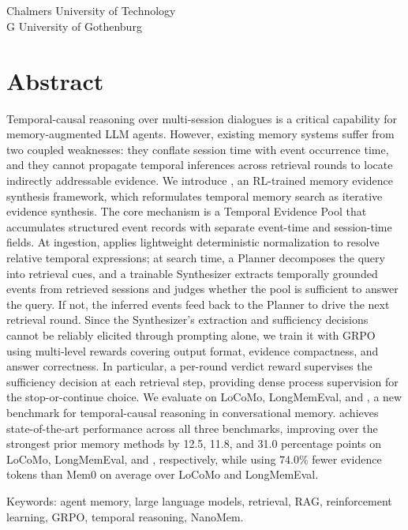 \ThesisTitle\\
\ThesisSubtitle\\
\ThesisAuthor\\
\ThesisDepartment\\
Chalmers University of Technology\\
\if\InstitutionLocation G
University of Gothenburg\\
\fi
\setlength{\parskip}{0.5cm}

\thispagestyle{plain}			%
\setlength{\parskip}{0pt plus 1.0pt}
\section*{Abstract}
Temporal-causal reasoning over multi-session dialogues is a critical capability
for memory-augmented LLM agents. However, existing memory systems suffer from
two coupled weaknesses: they conflate session time with event occurrence time,
and they cannot propagate temporal inferences across retrieval rounds to locate
indirectly addressable evidence. We introduce \sys{}, an RL-trained memory
evidence synthesis framework, which reformulates temporal memory search as
iterative evidence synthesis. The core mechanism is a Temporal Evidence Pool
that accumulates structured event records with separate event-time and
session-time fields. At ingestion, \sys{} applies lightweight deterministic
normalization to resolve relative temporal expressions; at search time, a
Planner decomposes the query into retrieval cues, and a trainable Synthesizer
extracts temporally grounded events from retrieved sessions and judges whether
the pool is sufficient to answer the query. If not, the inferred events feed
back to the Planner to drive the next retrieval round. Since the Synthesizer's
extraction and sufficiency decisions cannot be reliably elicited through
prompting alone, we train it with GRPO using multi-level rewards covering output
format, evidence compactness, and answer correctness. In particular, a
per-round verdict reward supervises the sufficiency decision at each retrieval
step, providing dense process supervision for the stop-or-continue choice. We
evaluate \sys{} on LoCoMo, LongMemEval, and \bench{}, a new benchmark for
temporal-causal reasoning in conversational memory. \sys{} achieves
state-of-the-art performance across all three benchmarks, improving over the
strongest prior memory methods by 12.5, 11.8, and 31.0 percentage points on
LoCoMo, LongMemEval, and \bench{}, respectively, while using 74.0\% fewer
evidence tokens than Mem0 on average over LoCoMo and LongMemEval.

\vfill
Keywords: agent memory, large language models, retrieval, RAG, reinforcement learning, GRPO, temporal reasoning, NanoMem.

\newpage				%
\thispagestyle{empty}
\mbox{}
